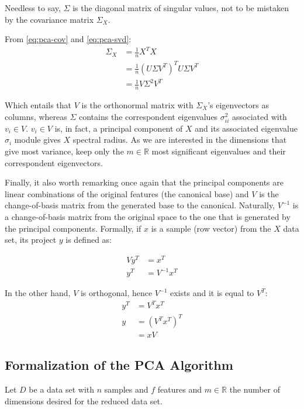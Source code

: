 \documentclass[12pt]{report}
\begin{document}
Needless to say, $\Sigma$ is the diagonal matrix of singular values, not to be mistaken by the covariance matrix $\Sigma_X$.

From \ref{eq:pca-cov} and \ref{eq:pca-svd}:
\begin{align*}
	\Sigma_X &= \frac{1}{n} X^TX \\
	&= \frac{1}{n} (U\Sigma V^T)^TU\Sigma V^T \\
	&= \frac{1}{n} V\Sigma^2 V^T
\end{align*}

Which entails that $V$ is the orthonormal matrix with $\Sigma_X$'s eigenvectors as columns, whereas $\Sigma$ contains the correspondent eigenvalues $\sigma_{ii}^2$ associated with $v_i\in V$. $v_i\in V$ is, in fact, a principal component of $X$ and its associated eigenvalue $\sigma_i$ module gives $X$ spectral radius. As we are interested in the dimensions that give most variance, keep only the $m\in\mathbb{R}$ most significant eigenvalues and their correspondent eigenvectors.

Finally, it also worth remarking once again that the principal components are linear combinations of the original features (the canonical base) and $V$ is the change-of-basis matrix from the generated base to the canonical. Naturally, $V^{-1}$ is a change-of-basis matrix from the original space to the one that is generated by the principal components. Formally, if $x$ is a sample (row vector) from the $X$ data set, its project $y$ is defined as:

\begin{align*}
	Vy^T &= x^T \\
	y^T  &= V^{-1}x^T
\end{align*}

In the other hand, $V$ is orthogonal, hence $V^{-1}$ exists and it is equal to $V^T$: \begin{align*}
	y^T &= V^Tx^T \\
	y &= (V^Tx^T)^T \\
      &= xV
\end{align*}

\subsection{Formalization of the PCA Algorithm}

Let $D$ be a data set with $n$ samples and $f$ features and $m\in\mathbb{R}$ the number of dimensions desired for the reduced data set. \cite{pca2002} \cite{pcapy}
\end{document}
